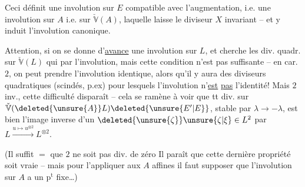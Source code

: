 Ceci  définit une involution sur
$E$ compatible avec l'augmentation, i.e.
une involution sur $A$ i.e. sur $\check{\mathbb V}(A)$,
laquelle laisse le diviseur $X$ invariant --
et y induit l'involution canonique.

Attention, si on se donne d'\uline{avance}
une involution sur $L$, et cherche les
div. quadr. sur $\check{\mathbb V}(L)$ qui  
 par l'involution, 
mais cette condition n'est pas suffisante
-- en car. $2$, on peut prendre l'involution
identique, alors qu'il y aura des
diviseurs quadratiques (scindés, p.ex)
pour lesquels l'involution n'\uline{est} \uline{pas}
l'identité! Mais  $2$ inv., cette difficulté
disparaît -- cela se ramène à voir
que tt div. sur $\check{\mathbb V}(\deleted{\unsure{A}}L)\deleted{\unsure{E'|E}}$, stable
par $\lambda\to-\lambda$, est bien l'image inverse
d'un $\deleted{\unsure{\zeta}}\unsure{\zeta|\xi}\in L^2$ par $L\xrightarrow{u\mapsto u^{\otimes 2}} L^{\otimes 2}$.

(Il suffit $=$ que $2$ ne soit pas
div. de zéro \unsure{\ldots}  Il paraît que cette
dernière propriété soit vraie -- mais
pour l'appliquer aux $A$ affines 
il faut supposer que l'involution sur $A$
a un p$^{\mathrm t}$ fixe\ldots)

